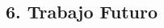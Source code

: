 \begin{spacing}{1.5}
  \begin{tightcenter}
    \section{6. Trabajo Futuro}
    \mylinespacing
  \end{tightcenter}

  \mylinespacing
  \mylinespacing
  \begin{tightcenter}
  \end{tightcenter}
\end{spacing}